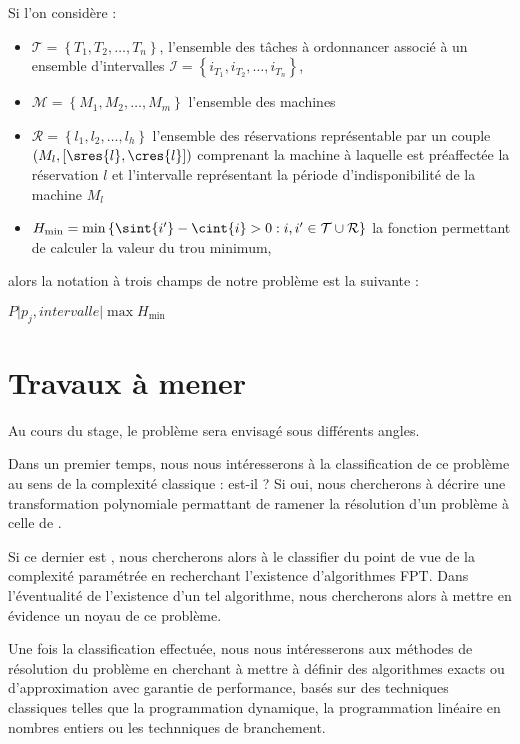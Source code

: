 \documentclass[a4paper,11pt]{report}
\begin{document}
Si l'on considère :
\begin{itemize}
    \item $\mathcal{T} = \left\{ T_1, T_2, \dots, T_n \right\}$, l'ensemble des tâches à ordonnancer
        associé à un ensemble d'intervalles $\mathcal{I} = \left\{ i_{T_1}, i_{T_2}, \dots,
        i_{T_n} \right\}$,
    \item $\mathcal{M} = \left\{ M_1, M_2, \dots, M_m \right\}$ l'ensemble des machines 
    \item $\mathcal{R} = \left\{ l_1, l_2, \dots, l_h \right\}$ l'ensemble des réservations
        représentable par un couple $\left( M_l, \left[ \sres{l}, \cres{l} \right] \right)$
        comprenant la machine à laquelle est préaffectée la réservation $l$ et l'intervalle
        représentant la période d'indisponibilité de la machine $M_l$
    \item $H_{\min} = \min \left\{ \sint{i'} - \cint{i} > 0 : i, i' \in \mathcal{T} \cup
        \mathcal{R} \right\}$ la fonction permettant de calculer la valeur du trou minimum,
\end{itemize}
alors la notation à trois champs de notre problème est la suivante :
\begin{center}
    $P \Big| p_j, intervalle \Big| \max H_{\min}$
\end{center}

\newpage

\chapter{Travaux à mener}

Au cours du stage, le problème \fisched{} sera envisagé sous différents angles.

Dans un premier temps, nous nous intéresserons à la classification de ce problème au sens de la
complexité classique : \fisched{} est-il \npc? Si oui, nous chercherons à décrire une transformation
polynomiale permattant de ramener la résolution d'un problème \npc à celle de \fisched{}.

Si ce dernier est \npc, nous chercherons alors à le classifier du point de vue de la complexité
paramétrée en recherchant l'existence d'algorithmes FPT. Dans l'éventualité de l'existence d'un tel
algorithme, nous chercherons alors à mettre en évidence un noyau de ce problème.

Une fois la classification effectuée, nous nous intéresserons aux méthodes de résolution du problème
en cherchant à mettre à définir des algorithmes exacts ou d'approximation avec garantie de
performance, basés sur des techniques classiques telles que la programmation dynamique, la
programmation linéaire en nombres entiers ou les technniques de branchement. 
\end{document}
